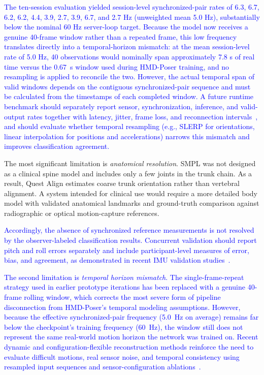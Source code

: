\documentclass[conference]{IEEEtran}
\newcommand{\CC}[1]{\textcolor{blue}{#1}}
\begin{document}
\CC{The ten-session evaluation yielded session-level synchronized-pair rates of 6.3, 6.7, 6.2, 6.2, 4.4, 3.9, 2.7, 3.9, 6.7, and 2.7 Hz (unweighted mean 5.0 Hz), substantially below the nominal 60 Hz server-loop target.
Because the model now receives a genuine 40-frame window rather than a repeated frame, this low frequency
translates directly into a temporal-horizon mismatch: at the mean session-level rate of 5.0 Hz, 40 observations would nominally span approximately 7.8 s of real
time versus the 0.67~s window used during HMD-Poser training, and no resampling is applied
to reconcile the two. However, the actual temporal span of valid windows depends on the contiguous synchronized-pair sequence and must be calculated from the timestamps of each completed window. A future runtime benchmark should separately report sensor,
synchronization, inference, and valid-output rates together with latency, jitter, frame
loss, and reconnection intervals~\cite{mobileposer,diffusionposer,ultrainertialposer}, and
should evaluate whether temporal resampling (e.g., SLERP for orientations, linear
interpolation for positions and accelerations) narrows this mismatch and improves
classification agreement.}

The most significant limitation is \textit{anatomical resolution}. SMPL was not designed
as a clinical spine model and includes only a few joints in the trunk chain. As a result,
Quest Align estimates coarse trunk orientation rather than vertebral alignment. A system
intended for clinical use would require a more detailed body model with validated
anatomical landmarks and ground-truth comparison against radiographic or optical
motion-capture references.

\CC{Accordingly, the absence of synchronized reference measurements is not resolved by the
observer-labeled classification results. Concurrent validation should report pitch and roll
errors separately and include participant-level measures of error, bias, and agreement, as
demonstrated in recent IMU validation studies~\cite{ali_trunk_validation,camptocormia_imu,villa_imu_validation}.}

\CC{The second limitation is \textit{temporal horizon mismatch}. The single-frame-repeat
strategy used in earlier prototype iterations has been replaced with a genuine 40-frame
rolling window, which corrects the most severe form of pipeline disconnection from
HMD-Poser's temporal modeling assumptions. However, because the effective synchronized-pair
frequency (5.0~Hz on average) remains far below the checkpoint's training frequency
(60~Hz), the window still does not represent the same real-world motion horizon the network
was trained on. Recent dynamic and configuration-flexible reconstruction methods reinforce
the need to evaluate difficult motions, real sensor noise, and temporal consistency using
resampled input sequences and sensor-configuration ablations~\cite{dynaip,diffusionposer}.}
\end{document}
